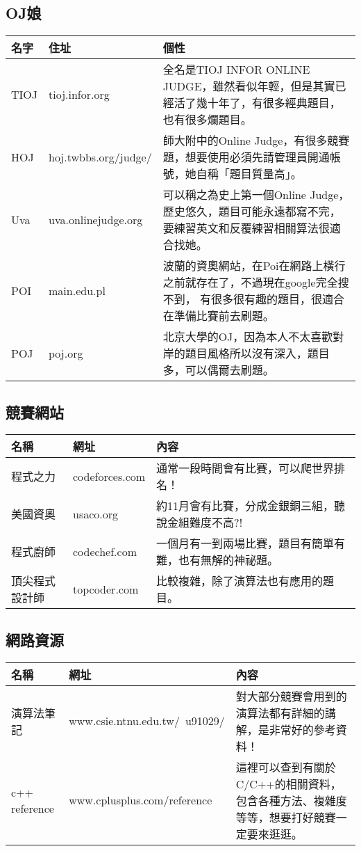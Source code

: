 \documentclass{article}
\begin{document}
\subsection{OJ娘}
\begin{tabular}[t]{llp{11cm}}
\hline
名字 & 住址 & 個性\\
\hline
TIOJ & tioj.infor.org &
全名是TIOJ INFOR ONLINE JUDGE，雖然看似年輕，但是其實已經活了幾十年了，有很多經典題目，
也有很多爛題目。\\
HOJ & hoj.twbbs.org/judge/ &
師大附中的Online Judge，有很多競賽題，想要使用必須先請管理員開通帳號，她自稱「題目質量高」。\\
Uva & uva.onlinejudge.org &
可以稱之為史上第一個Online Judge，歷史悠久，題目可能永遠都寫不完，要練習英文和反覆練習相關算法很適合找她。\\
POI & main.edu.pl &
波蘭的資奧網站，在Poi在網路上橫行之前就存在了，不過現在google完全搜不到，
有很多很有趣的題目，很適合在準備比賽前去刷題。\\
POJ & poj.org &
北京大學的OJ，因為本人不太喜歡對岸的題目風格所以沒有深入，題目多，可以偶爾去刷題。\\
\hline
\end{tabular}

\subsection{競賽網站}
\begin{tabular}[t]{llp{10cm}}
\hline
名稱 & 網址 & 內容\\
\hline
程式之力 & codeforces.com &
通常一段時間會有比賽，可以爬世界排名！\\
美國資奧 & usaco.org &
約11月會有比賽，分成金銀銅三組，聽說金組難度不高?!\\
程式廚師 & codechef.com &
一個月有一到兩場比賽，題目有簡單有難，也有無解的神祕題。\\
頂尖程式設計師 & topcoder.com &
比較複雜，除了演算法也有應用的題目。\\
\hline
\end{tabular}

\subsection{網路資源}
\begin{tabular}[t]{llp{7cm}}
\hline
名稱 & 網址 & 內容\\
\hline
演算法筆記 & www.csie.ntnu.edu.tw/~u91029/ &
對大部分競賽會用到的演算法都有詳細的講解，是非常好的參考資料！\\
c++ reference & www.cplusplus.com/reference &
這裡可以查到有關於C/C++的相關資料，包含各種方法、複雜度等等，想要打好競賽一定要來逛逛。\\
\hline
\end{tabular}
\end{document}
